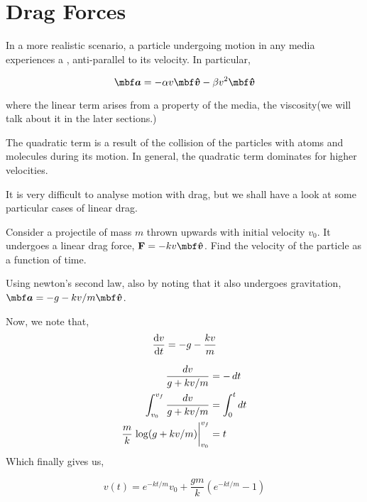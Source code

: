 \section{Drag Forces}

In a more realistic scenario, a particle undergoing motion in any 
media experiences a , anti-parallel to its velocity.
In particular,  

\begin{equation*}
    \vec{a} = -\alpha v \unitv{v} - \beta v^2 \unitv{v}
\end{equation*}

where the linear term arises from a property of the media, 
the viscosity(we will talk about it in the later sections.)

The quadratic term is a result of the collision of the particles with atoms 
and molecules during its motion. In general, 
the quadratic term dominates for higher velocities.

It is very difficult to analyse motion with drag, but we shall have a look at some particular 
cases of linear drag.


\begin{example}
    Consider a projectile of mass \(m\) thrown upwards with initial velocity \(v_0\). It undergoes a linear drag 
    force, \(\Vec{F} =  -kv \unitv{v}\). Find the velocity of the particle as 
    a function of time. 
    \begin{soln}
        Using newton's second law, also by noting that 
        it also undergoes gravitation, \(\vec{a} = -g -kv/m \unitv{v}\).

        Now, we note that, 
        \begin{equation*}
            \dv{v}{t} = -g  - \frac{kv}{m}
        \end{equation*}

        \begin{align*}
            \frac{\dd{v}}{g + kv/m} &= - \dd{t} \\
            \int_{v_0}^{v_f} \frac{\dd{v}}{g + kv/m} &= \int_{0}^{t}\dd{t} \\
            \frac{m}{k} \eval{\log(g + kv/m)}_{v_0}^{v_f} &= t \\
        \end{align*}
        Which finally gives us,

        \begin{equation}
            v(t) = e^{-kt/m}v_0 + \frac{gm}{k}(e^{-kt/m} - 1)
        \end{equation}

    \end{soln}
\end{example}

